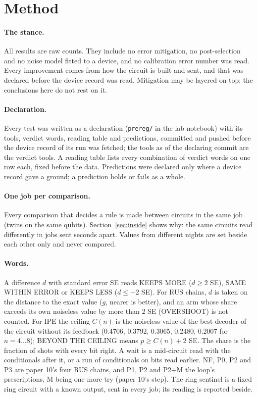 \documentclass[10pt,a4paper]{article}
\begin{document}
\section{Method}\label{sec:method}
\paragraph{The stance.} All results are raw counts. They include no error mitigation, no post-selection and no noise
model fitted to a device, and no calibration error number was read. Every improvement comes from how the circuit is
built and sent, and that was declared before the device record was read. Mitigation may be layered on top; the
conclusions here do not rest on it.

\paragraph{Declaration.} Every test was written as a declaration (\texttt{prereg/} in the lab notebook) with its tools,
verdict words, reading table and predictions, committed and pushed before the device record of its run was fetched;
the tools as of the declaring commit are the verdict tools. A reading table lists every combination of verdict words
on one row each, fixed before the data. Predictions were declared only where a device record gave a ground; a
prediction holds or fails as a whole.

\paragraph{One job per comparison.} Every comparison that decides a rule is made between circuits in the same job
(twins on the same qubits). Section~\ref{sec:inside} shows why: the same circuits read differently in jobs sent
seconds apart. Values from different nights are set beside each other only and never compared.

\paragraph{Words.} A difference $d$ with standard error SE reads KEEPS MORE ($d \ge 2$ SE), SAME WITHIN ERROR or
KEEPS LESS ($d \le -2$ SE). For RUS chains, $d$ is taken on the distance to the exact value ($g$, nearer is better), and
an arm whose share exceeds its own noiseless value by more than 2 SE (OVERSHOOT) is not counted. For IPE the ceiling
$C(n)$ is the noiseless value of the best decoder of the circuit without its feedback (0.4706, 0.3792, 0.3065, 0.2480,
0.2007 for $n = 4 \dots 8$); BEYOND THE CEILING means $p \ge C(n) + 2$ SE. The share is the fraction of shots with every bit right. A wait is a mid-circuit read with the conditionals after
it, or a run of conditionals on bits read earlier. NF, P0, P2
and P3 are paper 10's four RUS chains, and P1, P2 and P2+M the loop's prescriptions, M being one more try (paper 10's
step). The ring sentinel is a fixed ring circuit with a known output, sent in every job; its reading is reported
beside.
\end{document}
